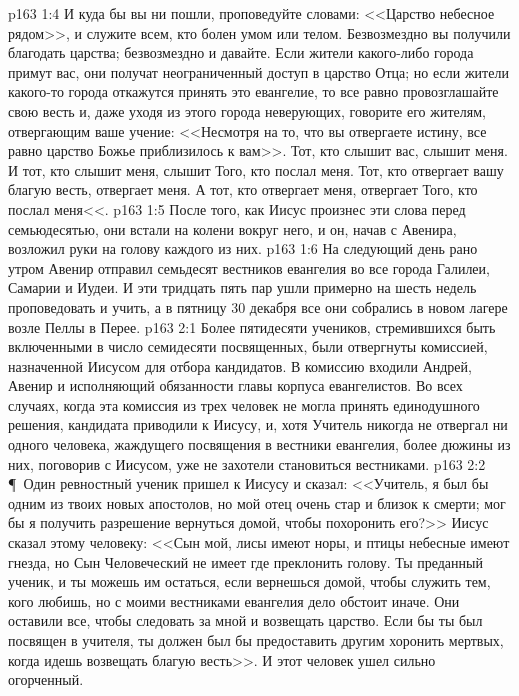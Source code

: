 \vs p163 1:4 И куда бы вы ни пошли, проповедуйте словами: <<Царство небесное рядом>>, и служите всем, кто болен умом или телом. Безвозмездно вы получили благодать царства; безвозмездно и давайте. Если жители какого\hyp{}либо города примут вас, они получат неограниченный доступ в царство Отца; но если жители какого\hyp{}то города откажутся принять это евангелие, то все равно провозглашайте свою весть и, даже уходя из этого города неверующих, говорите его жителям, отвергающим ваше учение: <<Несмотря на то, что вы отвергаете истину, все равно царство Божье приблизилось к вам>>. Тот, кто слышит вас, слышит меня. И тот, кто слышит меня, слышит Того, кто послал меня. Тот, кто отвергает вашу благую весть, отвергает меня. А тот, кто отвергает меня, отвергает Того, кто послал меня<<.
\vs p163 1:5 После того, как Иисус произнес эти слова перед семьюдесятью, они встали на колени вокруг него, и он, начав с Авенира, возложил руки на голову каждого из них.
\vs p163 1:6 На следующий день рано утром Авенир отправил семьдесят вестников евангелия во все города Галилеи, Самарии и Иудеи. И эти тридцать пять пар ушли примерно на шесть недель проповедовать и учить, а в пятницу 30 декабря все они собрались в новом лагере возле Пеллы в Перее.
\vs p163 2:1 Более пятидесяти учеников, стремившихся быть включенными в число семидесяти посвященных, были отвергнуты комиссией, назначенной Иисусом для отбора кандидатов. В комиссию входили Андрей, Авенир и исполняющий обязанности главы корпуса евангелистов. Во всех случаях, когда эта комиссия из трех человек не могла принять единодушного решения, кандидата приводили к Иисусу, и, хотя Учитель никогда не отвергал ни одного человека, жаждущего посвящения в вестники евангелия, более дюжины из них, поговорив с Иисусом, уже не захотели становиться вестниками.
\vs p163 2:2 \P\ Один ревностный ученик пришел к Иисусу и сказал: <<Учитель, я был бы одним из твоих новых апостолов, но мой отец очень стар и близок к смерти; мог бы я получить разрешение вернуться домой, чтобы похоронить его?>> Иисус сказал этому человеку: <<Сын мой, лисы имеют норы, и птицы небесные имеют гнезда, но Сын Человеческий не имеет где преклонить голову. Ты преданный ученик, и ты можешь им остаться, если вернешься домой, чтобы служить тем, кого любишь, но с моими вестниками евангелия дело обстоит иначе. Они оставили все, чтобы следовать за мной и возвещать царство. Если бы ты был посвящен в учителя, ты должен был бы предоставить другим хоронить мертвых, когда идешь возвещать благую весть>>. И этот человек ушел сильно огорченный.
